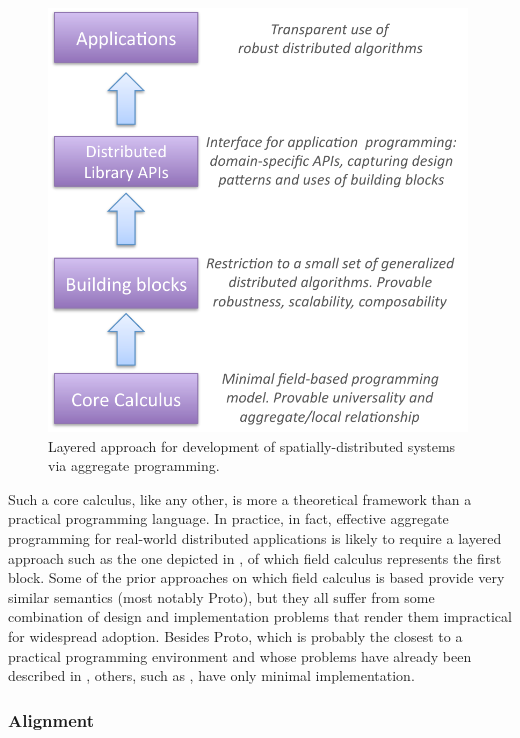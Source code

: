 \documentclass[12pt,a4paper,twoside,openright]{book}
\begin{document}
\begin{figure}
\centering
\includegraphics[width=0.99\textwidth]{img/aggregate-tower}
\caption{Layered approach for development of spatially-distributed systems via aggregate programming.}
\label{img:researchprogram}
\end{figure}

Such a core calculus, like any other, is more a theoretical framework than a practical programming language.
%
In practice, in fact, effective aggregate programming for real-world distributed applications is likely to require a layered approach such as the one depicted in , of which field calculus represents the first block.
%
Some of the prior approaches on which field calculus is based provide very similar semantics (most notably Proto), but they all suffer from some combination of design and implementation problems that render them impractical for widespread adoption.
%
Besides Proto, which is probably the closest to a practical programming environment and whose problems have already been described in , others, such as \cite{VPB-COORD2012}, have only minimal implementation.


\subsubsection{Alignment}
\end{document}
